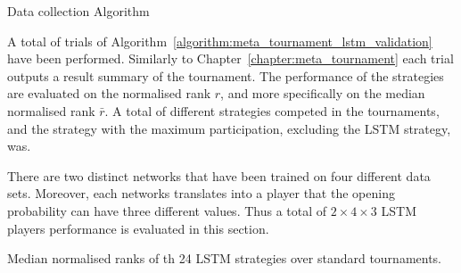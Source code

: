 
\begin{algorithm}[!htbp]
    \;
    \caption{Data collection Algorithm}
    \label{algorithm:meta_tournament_lstm_validation}
\end{algorithm}

A total of \metatournamentslstm trials of
Algorithm~\ref{algorithm:meta_tournament_lstm_validation} have been performed.
Similarly to Chapter~\ref{chapter:meta_tournament} each trial outputs a result
summary of the tournament. The performance of the strategies are evaluated on
the normalised rank \(r\), and more specifically on the median normalised rank
\(\bar{r}\). A total of different strategies competed in the tournaments, and
the strategy with the maximum participation, excluding the LSTM strategy, was.

There are two distinct networks that have been trained on four different data
sets. Moreover, each networks translates into a player that the opening
probability can have three different values. Thus a total of $2 \times 4 \times
3$ LSTM players performance is evaluated in this section.

\begin{table}[!htbp]
    \begin{center}
    \resizebox{.9\textwidth}{!}{
        
    }
\end{center}
\caption{Median normalised ranks of th 24 LSTM strategies over standard tournaments.}
\end{table}

